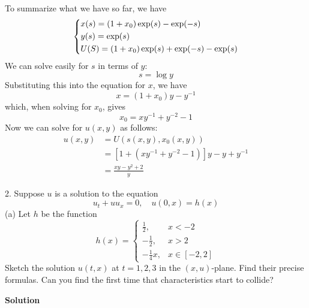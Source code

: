 \documentclass{article}
\begin{document}
%
To summarize what we have so far, we have
%
\begin{equation*}
    \begin{dcases}
        x(s) = (1 + x_0) \exp(s) - \exp(-s) \\
        y(s) = \exp(s) \\
        U(S) = (1 + x_0) \exp(s) + \exp(-s) - \exp(s)
    \end{dcases}
\end{equation*}
%
We can solve easily for $s$ in terms of $y$:
%
\begin{equation*}
    s = \log y
\end{equation*}
%
Substituting this into the equation for $x$, we have
%
\begin{equation*}
    x = (1 + x_0) y - y^{-1}
\end{equation*}
%
which, when solving for $x_0$, gives
%
\begin{equation*}
    x_0 = x y^{-1} + y^{-2} - 1
\end{equation*}
%
Now we can solve for $u(x, y)$ as follows:
%
\begin{align*}
    u(x, y) &= U(s(x, y), x_0(x, y)) \\
            &= \left[1 + \left(x y^{-1} + y^{-2} - 1\right)\right] y - y + y^{-1} \\
            &= \frac{x y - y^2 + 2}{y}
\end{align*}

\vspace{5mm}

2. Suppose $u$ is a solution to the equation
%
\begin{equation*}
    u_t + u u_x = 0, \quad u(0, x) = h(x)
\end{equation*}
%
(a) Let $h$ be the function
%
\begin{equation*}
    h(x) =
        \begin{cases}
            \frac{1}{2}, & x < -2 \\
            -\frac{1}{2}, & x > 2 \\
            -\frac{1}{4} x, & x \in [-2, 2]
        \end{cases}
\end{equation*}
%
Sketch the solution $u(t, x)$ at $t = 1, 2, 3$ in the $(x, u)$-plane.
Find their precise formulas. Can you find the first time that
characteristics start to collide?

\textbf{Solution}
\end{document}
